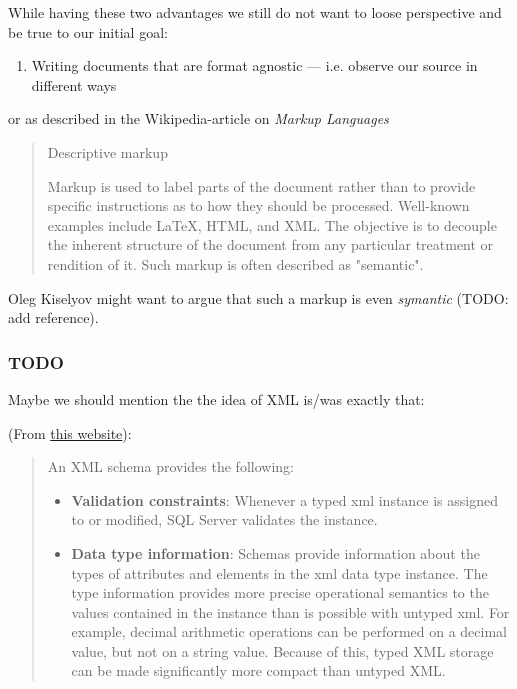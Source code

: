 \documentclass[11pt]{article}
\begin{document}
While having these two advantages we still do not want to loose perspective and
be true to our initial goal:

\begin{enumerate}
\item Writing documents that are format agnostic — i.e. observe our source in
different ways
\end{enumerate}

or as described in the Wikipedia-article on \emph{Markup Languages}

\begin{quote}
Descriptive markup

Markup is used to label parts of the document rather than to provide specific
instructions as to how they should be processed. Well-known examples include
\LaTeX{}, HTML, and XML. The objective is to decouple the inherent structure of the
document from any particular treatment or rendition of it. Such markup is often
described as "semantic".
\end{quote}

Oleg Kiselyov might want to argue that such a markup is even \emph{symantic} (TODO:
add reference).

\subsubsection{{\bfseries\sffamily TODO} }
\label{sec:org5fcc79f}

Maybe we should mention the the idea of XML is/was exactly that:

(From \href{https://docs.microsoft.com/en-us/sql/relational-databases/xml/compare-typed-xml-to-untyped-xml}{this website}):

\begin{quote}
An XML schema provides the following:

\begin{itemize}
\item \textbf{Validation constraints}: Whenever a typed xml instance is assigned to or
modified, SQL Server validates the instance.

\item \textbf{Data type information}: Schemas provide information about the types of
attributes and elements in the xml data type instance. The type information
provides more precise operational semantics to the values contained in the
instance than is possible with untyped xml. For example, decimal arithmetic
operations can be performed on a decimal value, but not on a string value.
Because of this, typed XML storage can be made significantly more compact than
untyped XML.
\end{itemize}
\end{quote}
\end{document}
